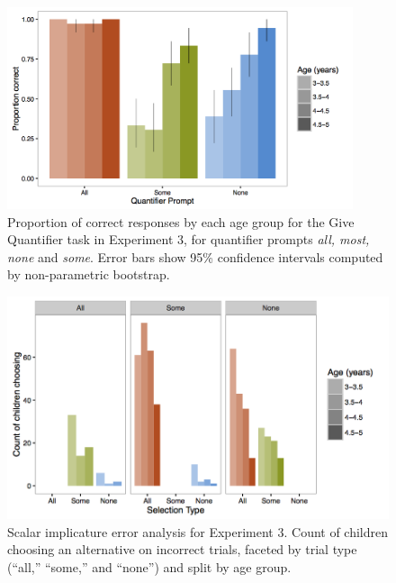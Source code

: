 \documentclass[man]{apa2}
\begin{document}
\begin{figure}
 \begin{center}
  \includegraphics[width=4in]{figures/exp3_GQperf.png}
  \caption{\label{fig:exp3_GQright} Proportion of correct responses by each age group for the Give Quantifier task in Experiment 3, for quantifier prompts \textit{all, most, none} and \textit{some}. Error bars show 95\% confidence intervals computed by non-parametric bootstrap.}
 \end{center}
\end{figure}

\begin{figure}
 \begin{center}
  \includegraphics[width=4.5in]{figures/exp3_SIwrong.png}
  \caption{\label{fig:exp3_wrong} Scalar implicature error analysis for Experiment 3. Count of children choosing an alternative on incorrect trials, faceted by trial type (``all,'' ``some,'' and ``none'') and split by age group.}
 \end{center}
\end{figure}
\end{document}
